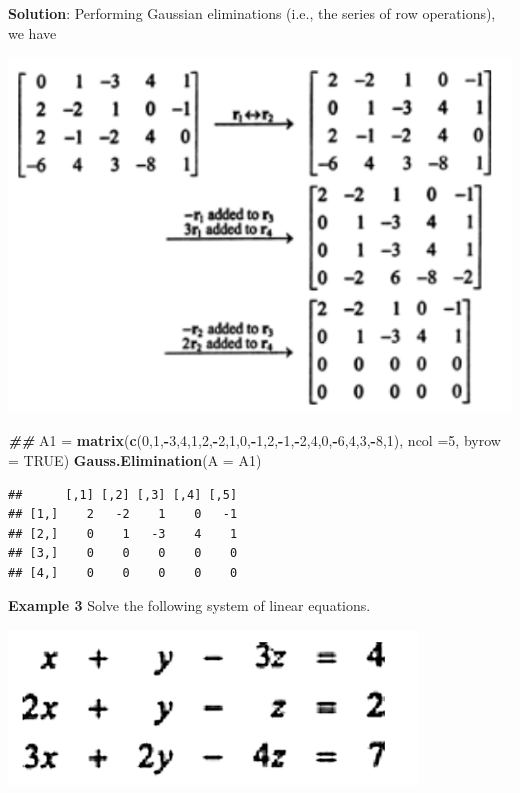 \documentclass[
]{book}
\newenvironment{Shaded}{\begin{snugshade}}{\end{snugshade}}
\newcommand{\AttributeTok}[1]{\textcolor[rgb]{0.13,0.29,0.53}{#1}}
\newcommand{\ConstantTok}[1]{\textcolor[rgb]{0.56,0.35,0.01}{#1}}
\newcommand{\DecValTok}[1]{\textcolor[rgb]{0.00,0.00,0.81}{#1}}
\newcommand{\DocumentationTok}[1]{\textcolor[rgb]{0.56,0.35,0.01}{\textbf{\textit{#1}}}}
\newcommand{\FunctionTok}[1]{\textcolor[rgb]{0.13,0.29,0.53}{\textbf{#1}}}
\newcommand{\NormalTok}[1]{#1}
\newcommand{\OtherTok}[1]{\textcolor[rgb]{0.56,0.35,0.01}{#1}}
\newcommand{\SpecialCharTok}[1]{\textcolor[rgb]{0.81,0.36,0.00}{\textbf{#1}}}
\begin{document}
\textbf{Solution}: Performing Gaussian eliminations (i.e., the series of row operations), we have

\begin{center}\includegraphics[width=0.55\linewidth]{img07/w07-LabExample02-sol} \end{center}

\begin{Shaded}
\begin{Highlighting}[]
\DocumentationTok{\#\#}
\NormalTok{A1 }\OtherTok{=} \FunctionTok{matrix}\NormalTok{(}\FunctionTok{c}\NormalTok{(}\DecValTok{0}\NormalTok{,}\DecValTok{1}\NormalTok{,}\SpecialCharTok{{-}}\DecValTok{3}\NormalTok{,}\DecValTok{4}\NormalTok{,}\DecValTok{1}\NormalTok{,}\DecValTok{2}\NormalTok{,}\SpecialCharTok{{-}}\DecValTok{2}\NormalTok{,}\DecValTok{1}\NormalTok{,}\DecValTok{0}\NormalTok{,}\SpecialCharTok{{-}}\DecValTok{1}\NormalTok{,}\DecValTok{2}\NormalTok{,}\SpecialCharTok{{-}}\DecValTok{1}\NormalTok{,}\SpecialCharTok{{-}}\DecValTok{2}\NormalTok{,}\DecValTok{4}\NormalTok{,}\DecValTok{0}\NormalTok{,}\SpecialCharTok{{-}}\DecValTok{6}\NormalTok{,}\DecValTok{4}\NormalTok{,}\DecValTok{3}\NormalTok{,}\SpecialCharTok{{-}}\DecValTok{8}\NormalTok{,}\DecValTok{1}\NormalTok{), }\AttributeTok{ncol =}\DecValTok{5}\NormalTok{, }\AttributeTok{byrow =} \ConstantTok{TRUE}\NormalTok{)}
\FunctionTok{Gauss.Elimination}\NormalTok{(}\AttributeTok{A =}\NormalTok{ A1)}
\end{Highlighting}
\end{Shaded}

\begin{verbatim}
##      [,1] [,2] [,3] [,4] [,5]
## [1,]    2   -2    1    0   -1
## [2,]    0    1   -3    4    1
## [3,]    0    0    0    0    0
## [4,]    0    0    0    0    0
\end{verbatim}

\hfill\break

\textbf{Example 3} Solve the following system of linear equations.

\begin{center}\includegraphics[width=0.35\linewidth]{img07/w07-LabExample03-eq} \end{center}
\end{document}
